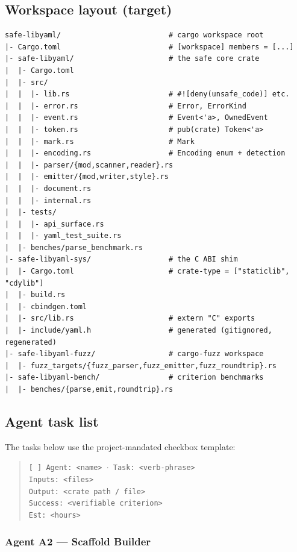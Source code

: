 \documentclass[12pt]{article}
\theoremstyle{definition}
\theoremstyle{remark}
\begin{document}
\subsection{Workspace layout (target)}

\begin{lstlisting}[language={}]
safe-libyaml/                         # cargo workspace root
|- Cargo.toml                         # [workspace] members = [...]
|- safe-libyaml/                      # the safe core crate
|  |- Cargo.toml
|  |- src/
|  |  |- lib.rs                       # #![deny(unsafe_code)] etc.
|  |  |- error.rs                     # Error, ErrorKind
|  |  |- event.rs                     # Event<'a>, OwnedEvent
|  |  |- token.rs                     # pub(crate) Token<'a>
|  |  |- mark.rs                      # Mark
|  |  |- encoding.rs                  # Encoding enum + detection
|  |  |- parser/{mod,scanner,reader}.rs
|  |  |- emitter/{mod,writer,style}.rs
|  |  |- document.rs
|  |  |- internal.rs
|  |- tests/
|  |  |- api_surface.rs
|  |  |- yaml_test_suite.rs
|  |- benches/parse_benchmark.rs
|- safe-libyaml-sys/                  # the C ABI shim
|  |- Cargo.toml                      # crate-type = ["staticlib", "cdylib"]
|  |- build.rs
|  |- cbindgen.toml
|  |- src/lib.rs                      # extern "C" exports
|  |- include/yaml.h                  # generated (gitignored, regenerated)
|- safe-libyaml-fuzz/                 # cargo-fuzz workspace
|  |- fuzz_targets/{fuzz_parser,fuzz_emitter,fuzz_roundtrip}.rs
|- safe-libyaml-bench/                # criterion benchmarks
|  |- benches/{parse,emit,roundtrip}.rs
\end{lstlisting}

\subsection{Agent task list}

The tasks below use the project-mandated checkbox template:
\begin{quote}
\texttt{[ ] Agent: <name> $\cdot$ Task: <verb-phrase>\\
        Inputs: <files>\\
        Output: <crate path / file>\\
        Success: <verifiable criterion>\\
        Est: <hours>}
\end{quote}

\subsubsection{Agent A2 --- Scaffold Builder}
\end{document}
